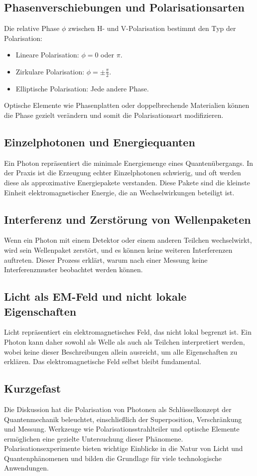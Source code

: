 \documentclass[12pt,a4paper]{article}
\begin{document}
	\subsection{Phasenverschiebungen und Polarisationsarten}
	Die relative Phase \(\phi\) zwischen H- und V-Polarisation bestimmt den Typ der Polarisation:
	\begin{itemize}
		\item Lineare Polarisation: \(\phi = 0\) oder \(\pi\).
		\item Zirkulare Polarisation: \(\phi = \pm\frac{\pi}{2}\).
		\item Elliptische Polarisation: Jede andere Phase.
	\end{itemize}
	Optische Elemente wie Phasenplatten oder doppelbrechende Materialien können die Phase gezielt verändern und somit die Polarisationsart modifizieren.
	
	\subsection{Einzelphotonen und Energiequanten}
	Ein Photon repräsentiert die minimale Energiemenge eines Quantenübergangs. In der Praxis ist die Erzeugung echter Einzelphotonen schwierig, und oft werden diese als approximative Energiepakete verstanden. Diese Pakete sind die kleinste Einheit elektromagnetischer Energie, die an Wechselwirkungen beteiligt ist.
	
	\subsection{Interferenz und Zerstörung von Wellenpaketen}
	Wenn ein Photon mit einem Detektor oder einem anderen Teilchen wechselwirkt, wird sein Wellenpaket zerstört, und es können keine weiteren Interferenzen auftreten. Dieser Prozess erklärt, warum nach einer Messung keine Interferenzmuster beobachtet werden können.
	
	
	\subsection{Licht als EM-Feld und nicht lokale Eigenschaften}
	Licht repräsentiert ein elektromagnetisches Feld, das nicht lokal begrenzt ist. Ein Photon kann daher sowohl als Welle als auch als Teilchen interpretiert werden, wobei keine dieser Beschreibungen allein ausreicht, um alle Eigenschaften zu erklären. Das elektromagnetische Feld selbst bleibt fundamental.
	
	\subsection{Kurzgefast}
	Die Diskussion hat die Polarisation von Photonen als Schlüsselkonzept der Quantenmechanik beleuchtet, einschließlich der Superposition, Verschränkung und Messung. Werkzeuge wie Polarisationsstrahlteiler und optische Elemente ermöglichen eine gezielte Untersuchung dieser Phänomene. Polarisationsexperimente bieten wichtige Einblicke in die Natur von Licht und Quantenphänomenen und bilden die Grundlage für viele technologische Anwendungen.
	
\end{document}
